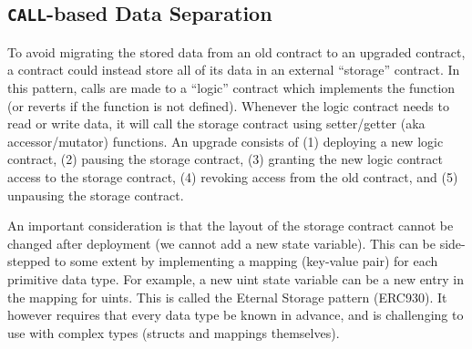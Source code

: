 



\subsection{\texttt{CALL}-based Data Separation}
\label{sec:callbased}

To avoid migrating the stored data from an old contract to an upgraded contract, a contract could instead store all of its data in an external ``storage'' contract. In this pattern, calls are made to a ``logic'' contract which implements the function (or reverts if the function is not defined). Whenever the logic contract needs to read or write data, it will call the storage contract using setter/getter (aka accessor/mutator) functions. An upgrade consists of (1) deploying a new logic contract, (2) pausing the storage contract, (3) granting the new logic contract access to the storage contract, (4) revoking access from the old contract, and (5) unpausing the storage contract. 

An important consideration is that the layout of the storage contract cannot be changed after deployment (\eg we cannot add a new state variable). This can be side-stepped to some extent by implementing a mapping (key-value pair) for each primitive data type. For example, a new uint state variable can be a new entry in the mapping for uints. This is called the Eternal Storage pattern (ERC930). It however requires that every data type be known in advance, and is challenging to use with complex types (\eg structs and mappings themselves).

